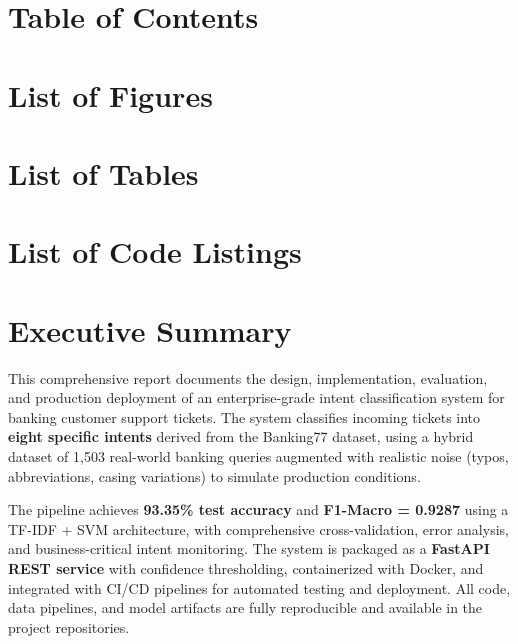 \documentclass[12pt,a4paper]{article}
\begin{document}
\section*{Table of Contents}
\tableofcontents
\newpage

\section*{List of Figures}
\listoffigures
\newpage

\section*{List of Tables}
\listoftables
\newpage

\section*{List of Code Listings}
\lstlistoflistings
\newpage

\setcounter{page}{1}
\section*{Executive Summary}

\begin{insightbox}
This comprehensive report documents the design, implementation, evaluation, and production deployment of an enterprise-grade intent classification system for banking customer support tickets. The system classifies incoming tickets into \textbf{eight specific intents} derived from the Banking77 dataset, using a hybrid dataset of 1,503 real-world banking queries augmented with realistic noise (typos, abbreviations, casing variations) to simulate production conditions.

The pipeline achieves \textbf{93.35\% test accuracy} and \textbf{F1-Macro = 0.9287} using a TF-IDF + SVM architecture, with comprehensive cross-validation, error analysis, and business-critical intent monitoring. The system is packaged as a \textbf{FastAPI REST service} with confidence thresholding, containerized with Docker, and integrated with CI/CD pipelines for automated testing and deployment. All code, data pipelines, and model artifacts are fully reproducible and available in the project repositories.
\end{insightbox}
\end{document}
